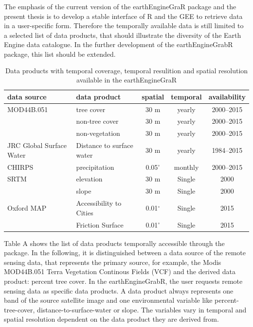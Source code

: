 The emphasis of the current version of the earthEngineGraR package and the present thesis is to develop a stable interface of R and the GEE to retrieve data in a user-specific form. Therefore the temporally available data is still limited to a selected list of data products, that should illustrate the diversity of the Earth Engine data catalogue. In the further development of the earthEngineGrabR package, this list should be extended.

\begin{table}[h]
	\begin{tabularx}{\textwidth}{llccc}
		\hline
		\textbf{data source} & \textbf{data product} & \textbf{spatial} & \textbf{temporal} & \textbf{availability}\\
		\hline
		
		MOD44B.051 & tree cover  & 30 m & yearly & 2000–2015 \\
		
		& non-tree cover  & 30 m & yearly & 2000–2015 \\
		
		& non-vegetation  & 30 m & yearly & 2000–2015 \\
		
		JRC Global Surface Water  & Distance to surface water & 30 m & yearly & 1984–2015 \\
		
		CHIRPS & precipitation & 0.05$^\circ$ & monthly & 2000–2015\\
		
		SRTM & elevation  & 30 m & Single & 2000\\
		& slope  & 30 m & Single & 2000\\
		
		Oxford MAP & Accessibility to Cities  & 0.01$^\circ$ & Single & 2015\\
		
		& Friction Surface  & 0.01$^\circ$  & Single & 2015\\
		
		\hline
	\end{tabularx}
	\caption{Data products with temporal coverage, temporal resulition and spatial resolution available in the earthEngineGraR}
\end{table}

Table A shows the list of data products temporally accessible through the package. In the following, it is distinguished between a data source of the remote sensing data, that represents the primary source, for example, the Modis MOD44B.051 Terra Vegetation Continous Fields (VCF) and the derived data product: percent tree cover. In the earthEngineGrabR, the user requests remote sensing data as specific data products. A data product always represents one band of the source satellite image and one environmental variable like percent-tree-cover, distance-to-surface-water or slope.
The variables vary in temporal and spatial resolution dependent on the data product they are derived from. 

